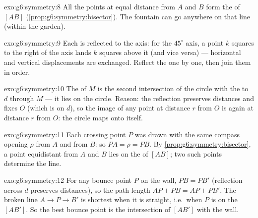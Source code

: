 \begin{solution}{exo:g6:symmetry:8}
All the points at equal distance from $A$ and $B$ form the
 of $[AB]$ (\cref{prop:g6:symmetry:bisector}).
The fountain can go anywhere on that line (within the garden).
\end{solution}

\begin{solution}{exo:g6:symmetry:9}
Each  is reflected  to the axis: for the
$45^\circ$ axis, a point $k$ squares to the right of the axis lands
$k$ squares above it (and vice versa) --- horizontal and vertical
displacements are exchanged. Reflect the  one by one, then
join them in order.
\end{solution}

\begin{solution}{exo:g6:symmetry:10}
The  of $M$ is the second intersection of the circle with the
 to $d$ through $M$ --- it lies on the circle. Reason:
the reflection preserves distances and fixes $O$ (which is on $d$), so
the image of any point at distance $r$ from $O$ is again at distance
$r$ from $O$: the circle maps onto itself.
\end{solution}

\begin{solution}{exo:g6:symmetry:11}
Each crossing point $P$ was drawn with the same compass opening $\rho$
from $A$ and from $B$: so $PA = \rho = PB$. By
\cref{prop:g6:symmetry:bisector}, a point equidistant from $A$ and $B$
lies on the  of $[AB]$; two such points determine
the line.
\end{solution}

\begin{solution}{exo:g6:symmetry:12}
For any bounce point $P$ on the wall, $PB = PB'$ (reflection across
$d$ preserves distances), so the path length
$AP + PB = AP + PB'$. The broken line $A \to P \to B'$ is shortest
when it is straight, i.e.\ when $P$ is on the  $[AB']$. So the
best bounce point is the intersection of $[AB']$ with the wall.
\end{solution}

